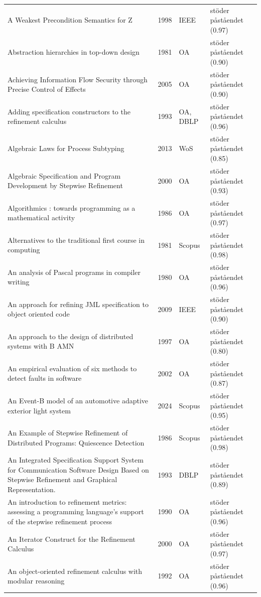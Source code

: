 \begin{longtable}{@{}%
  >{\raggedright\arraybackslash}p{}c%
  >{\raggedright\arraybackslash}p{}%
  >{\raggedright\arraybackslash}p{}@{}}
A Weakest Precondition Semantics for Z & 1998 & IEEE & stöder påståendet (0.97) \\
Abstraction hierarchies in top-down design & 1981 & OA & stöder påståendet (0.90) \\
Achieving Information Flow Security through Precise Control of Effects & 2005 & OA & stöder påståendet (0.90) \\
Adding specification constructors to the refinement calculus & 1993 & OA, DBLP & stöder påståendet (0.96) \\
Algebraic Laws for Process Subtyping & 2013 & WoS & stöder påståendet (0.85) \\
Algebraic Specification and Program Development by Stepwise Refinement & 2000 & OA & stöder påståendet (0.93) \\
Algorithmics : towards programming as a mathematical activity & 1986 & OA & stöder påståendet (0.97) \\
Alternatives to the traditional first course in computing & 1981 & Scopus & stöder påståendet (0.98) \\
An analysis of Pascal programs in compiler writing & 1980 & OA & stöder påståendet (0.96) \\
An approach for refining JML specification to object oriented code & 2009 & IEEE & stöder påståendet (0.90) \\
An approach to the design of distributed systems with B AMN & 1997 & OA & stöder påståendet (0.80) \\
An empirical evaluation of six methods to detect faults in software & 2002 & OA & stöder påståendet (0.87) \\
An Event-B model of an automotive adaptive exterior light system & 2024 & Scopus & stöder påståendet (0.95) \\
An Example of Stepwise Refinement of Distributed Programs: Quiescence Detection & 1986 & Scopus & stöder påståendet (0.98) \\
An Integrated Specification Support System for Communication Software Design Based on Stepwise Refinement and Graphical Representation. & 1993 & DBLP & stöder påståendet (0.89) \\
An introduction to refinement metrics: assessing a programming language's support of the stepwise refinement process & 1990 & OA & stöder påståendet (0.96) \\
An Iterator Construct for the Refinement Calculus & 2000 & OA & stöder påståendet (0.97) \\
An object-oriented refinement calculus with modular reasoning & 1992 & OA & stöder påståendet (0.96) \\

\end{longtable}
